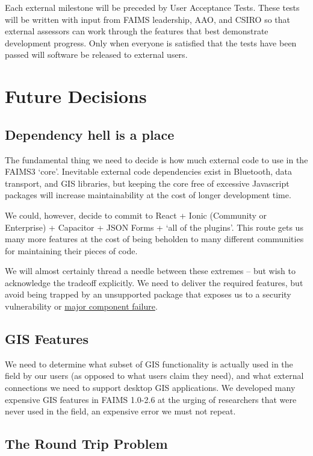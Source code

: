 \documentclass{faims3_report}
\begin{document}
Each external milestone will be preceded by User Acceptance Tests. These
tests will be written with input from FAIMS leadership, AAO, and CSIRO
so that external assessors can work through the features that best
demonstrate development progress. Only when everyone is satisfied that
the tests have been passed will software be released to external users.

\chapter{Future Decisions}

\section{Dependency hell is a
place}

The fundamental thing we need to decide is how much external code to use
in the FAIMS3 `core'. Inevitable external code dependencies exist in
Bluetooth, data transport, and GIS libraries, but keeping the core free
of excessive Javascript packages will increase maintainability at the
cost of longer development time.

We could, however, decide to commit to React + Ionic (Community or
Enterprise) + Capacitor + JSON Forms + `all of the plugins'. This route
gets us many more features at the cost of being beholden to many
different communities for maintaining their pieces of code.

We will almost certainly thread a needle between these extremes -- but
wish to acknowledge the tradeoff explicitly. We need to deliver the
required features, but avoid being trapped by an unsupported package
that exposes us to a security vulnerability or
\href{https://www.theregister.com/2016/03/23/npm_left_pad_chaos/}{{major
component failure}}.

\section{GIS Features}

We need to determine what subset of GIS functionality is actually used
in the field by our users (as opposed to what users claim they need),
and what external connections we need to support desktop GIS
applications. We developed many expensive GIS features in FAIMS 1.0-2.6
at the urging of researchers that were never used in the field, an
expensive error we must not repeat.

\section{The Round Trip Problem}
\end{document}
